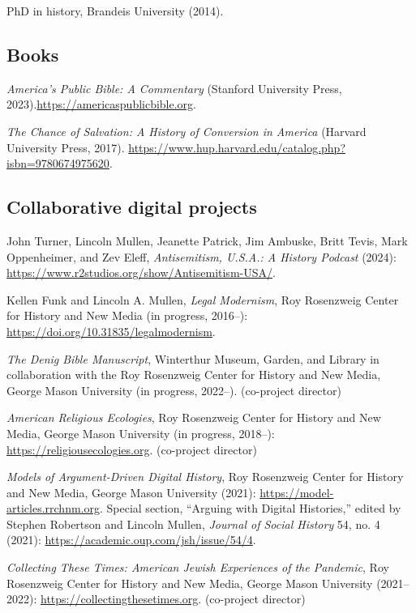 \documentclass[11pt]{article}
\begin{document}
PhD in history, Brandeis University (2014). 



\subsection{Books}\label{Books}

\emph{America's Public Bible: A Commentary} (Stanford University Press, 2023).\newline\url{https://americaspublicbible.org}.

\emph{The Chance of Salvation: A History of Conversion in America} (Harvard University Press, 2017). \url{https://www.hup.harvard.edu/catalog.php?isbn=9780674975620}.

\subsection{Collaborative digital projects}\label{Digital projects}

John Turner, Lincoln Mullen, Jeanette Patrick, Jim Ambuske, Britt Tevis, Mark Oppenheimer, and Zev Eleff, \emph{Antisemitism, U.S.A.: A History Podcast} (2024): \url{https://www.r2studios.org/show/Antisemitism-USA/}.

Kellen Funk and Lincoln A. Mullen, \emph{Legal Modernism}, Roy Rosenzweig Center for History and New Media (in progress, 2016--): \url{https://doi.org/10.31835/legalmodernism}.

\emph{The Denig Bible Manuscript}, Winterthur Museum, Garden, and Library in collaboration with the Roy Rosenzweig Center for History and New Media, George Mason University (in progress, 2022--). (co-project director)

\emph{American Religious Ecologies}, Roy Rosenzweig Center for History and New Media, George Mason University (in progress, 2018--): \url{https://religiousecologies.org}. (co-project director)

\emph{Models of Argument-Driven Digital History}, Roy Rosenzweig Center for History and New Media, George Mason University (2021): \url{https://model-articles.rrchnm.org}. Special section, ``Arguing with Digital Histories,'' edited by Stephen Robertson and Lincoln Mullen, \emph{Journal of Social History} 54, no. 4 (2021): \url{https://academic.oup.com/jsh/issue/54/4}. 

\emph{Collecting These Times: American Jewish Experiences of the Pandemic}, Roy Rosenzweig Center for History and New Media, George Mason University (2021--2022): \url{https://collectingthesetimes.org}. (co-project director)
\end{document}
